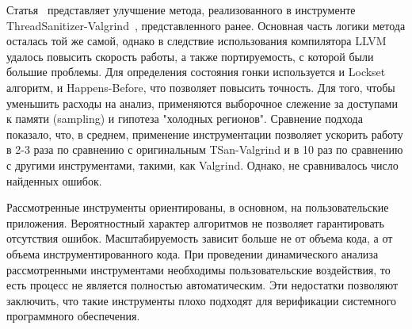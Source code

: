 Статья~\cite{Serebryany:2011} представляет улучшение метода, реализованного в инструменте ThreadSanitizer-Valgrind~\cite{TSan}, представленного ранее.
Основная часть логики метода осталась той же самой, однако в следствие использования компилятора LLVM удалось повысить скорость работы, а также портируемость, с которой были большие проблемы. 
Для определения состояния гонки используется и Lockset алгоритм, и Happens-Before, что позволяет повысить точность. 
Для того, чтобы уменьшить расходы на анализ, применяются выборочное слежение за доступами к памяти (sampling) и гипотеза "холодных регионов".
Сравнение подхода показало, что, в среднем, применение инструментации позволяет ускорить работу в 2-3 раза по сравнению с оригинальным TSan-Valgrind и в 10 раз по сравнению с другими инструментами, такими, как Valgrind. Однако, не сравнивалось число найденных ошибок. 

Рассмотренные инструменты ориентированы, в основном, на пользовательские приложения. 
Вероятностный характер алгоритмов не позволяет гарантировать отсутствия ошибок.
Масштабируемость зависит больше не от объема кода, а от объема инструментированного кода. 
При проведении динамического анализа рассмотренными инструментами необходимы пользовательские воздействия, то есть процесс не является полностью автоматическим.
Эти недостатки позволяют заключить, что такие инструменты плохо подходят для верификации системного программного обеспечения.

